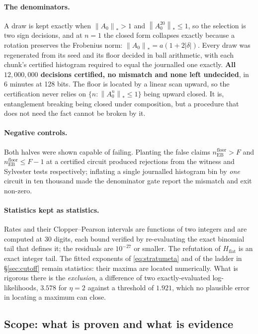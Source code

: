 \documentclass[11pt,a4paper]{article}
\theoremstyle{definition}
\theoremstyle{remark}
\newcommand{\floor}{n_{\mathrm{EB}}^{\mathrm{floor}}}
\newcommand{\nuc}[1]{\left\lVert #1 \right\rVert_{*}}
\begin{document}
\paragraph{The denominators.} A draw is kept exactly when $\nuc{A_0} > 1$ and $\nuc{A_0^{20}} \le 1$, so the selection is two sign decisions, and at $n=1$ the closed form collapses exactly because a rotation preserves the Frobenius norm: $\nuc{A_0} = a(1+2|\delta|)$. Every draw was regenerated from its seed and its floor decided in ball arithmetic, with each chunk's certified histogram required to equal the journalled one exactly. \textbf{All $12{,}000{,}000$ decisions certified, no mismatch and none left undecided}, in $6$ minutes at 128 bits. The floor is located by a linear scan upward, so the certification never relies on $\{n : \nuc{A_0^n} \le 1\}$ being upward closed. It is, entanglement breaking being closed under composition, but a procedure that does not need the fact cannot be broken by it.

\paragraph{Negative controls.} Both halves were shown capable of failing. Planting the false claims $\floor > F$ and $\floor \le F-1$ at a certified circuit produced rejections from the witness and Sylvester tests respectively; inflating a single journalled histogram bin by \emph{one} circuit in ten thousand made the denominator gate report the mismatch and exit non-zero.

\paragraph{Statistics kept as statistics.} Rates and their Clopper--Pearson intervals are functions of two integers and are computed at 30 digits, each bound verified by re-evaluating the exact binomial tail that defines it; the residuals are $10^{-27}$ or smaller. The refutation of $H_{\mathrm{flat}}$ is an exact integer tail. The fitted exponents of \eqref{eq:stratumeta} and of the ladder in \S\ref{sec:cutoff} remain statistics: their maxima are located numerically. What is rigorous there is the \emph{exclusion}, a difference of two exactly-evaluated log-likelihoods, $3.578$ for $\eta = 2$ against a threshold of $1.921$, which no plausible error in locating a maximum can close.

\subsection{Scope: what is proven and what is evidence}\label{sec:scope}
\end{document}
